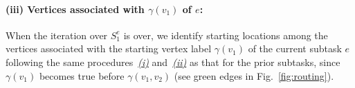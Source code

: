 \documentclass[Afour,sageh,times]{sagej}
\newcommand{\clause}[1]{\mathsf{cls}(#1)}
\newcommand{\ag}[2]{\langle#1,#2\rangle}
\renewcommand{\ap}[3]{\mathcal{\pi}_{{#1},{#2}}^{#3}}
\begin{document}

\paragraph{(iii) Vertices associated with $\gamma(v_1)$ of $e$:}\label{sec:c} When the iteration over $S_1^e$ is over, we identify  starting locations among the vertices associated with the starting vertex label  $\gamma(v_1)$ of the current subtask $e$ following the same procedures~\hyperref[sec:a]{\it (i)} and~\hyperref[sec:b]{\it (ii)} as that for the prior subtasks, since $\gamma(v_1)$  becomes true before $\gamma(v_1, v_2)$ (see green edges in Fig.~\ref{fig:routing}).
\end{document}
